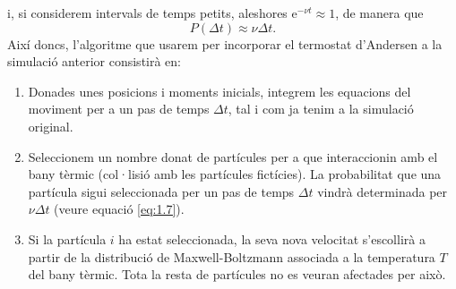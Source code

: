 \documentclass[a4paper,10.5pt]{report}
\begin{document}
i, si considerem intervals de temps petits, aleshores e$^{-\nu t} \approx 1$, de manera que
\begin{equation}
	P(\Delta t) \approx \nu \Delta t. \label{eq:1.7}
\end{equation}
Així doncs, l'algoritme que usarem per incorporar el termostat d'Andersen a la simulació anterior consistirà en:
\begin{enumerate}
	\item Donades unes posicions i moments inicials, integrem les equacions del moviment per a un pas de temps $\Delta t$, tal i com ja tenim a la simulació original.
	\item Seleccionem un nombre donat de partícules per a que interaccionin amb el bany tèrmic (col·lisió amb les partícules fictícies). La probabilitat que una partícula sigui seleccionada per un pas de temps $\Delta t$ vindrà determinada per $\nu \Delta t$ (veure equació \eqref{eq:1.7}).
	\item Si la partícula $i$ ha estat seleccionada, la seva nova velocitat s'escollirà a partir de la distribució de Maxwell-Boltzmann associada a la temperatura $T$ del bany tèrmic. Tota la resta de partícules no es veuran afectades per això.
	

\end{enumerate}
\end{document}
